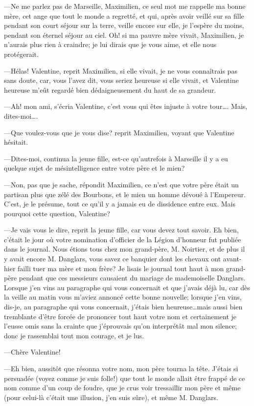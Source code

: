 —Ne me parlez pas de Marseille, Maximilien, ce seul mot me rappelle ma bonne mère, cet ange que tout le monde a regretté, et qui, après avoir veillé sur sa fille pendant son court séjour sur la terre, veille encore sur elle, je l'espère du moins, pendant son éternel séjour au ciel. Oh! si ma pauvre mère vivait, Maximilien, je n'aurais plus rien à craindre; je lui dirais que je vous aime, et elle nous protégerait. 

—Hélas! Valentine, reprit Maximilien, si elle vivait, je ne vous connaîtrais pas sans doute, car, vous l'avez dit, vous seriez heureuse si elle vivait, et Valentine heureuse m'eût regardé bien dédaigneusement du haut de sa grandeur. 

—Ah! mon ami, s'écria Valentine, c'est vous qui êtes injuste à votre tour\dots. Mais, dites-moi\dots. 

—Que voulez-vous que je vous dise? reprit Maximilien, voyant que Valentine hésitait. 

—Dites-moi, continua la jeune fille, est-ce qu'autrefois à Marseille il y a eu quelque sujet de mésintelligence entre votre père et le mien? 

—Non, pas que je sache, répondit Maximilien, ce n'est que votre père était un partisan plus que zélé des Bourbons, et le mien un homme dévoué à l'Empereur. C'est, je le présume, tout ce qu'il y a jamais eu de dissidence entre eux. Mais pourquoi cette question, Valentine? 

—Je vais vous le dire, reprit la jeune fille, car vous devez tout savoir. Eh bien, c'était le jour où votre nomination d'officier de la Légion d'honneur fut publiée dans le journal. Nous étions tous chez mon grand-père, M. Noirtier, et de plus il y avait encore M. Danglars, vous savez ce banquier dont les chevaux ont avant-hier failli tuer ma mère et mon frère? Je lisais le journal tout haut à mon grand-père pendant que ces messieurs causaient du mariage de mademoiselle Danglars. Lorsque j'en vins au paragraphe qui vous concernait et que j'avais déjà lu, car dès la veille au matin vous m'aviez annoncé cette bonne nouvelle; lorsque j'en vins, dis-je, au paragraphe qui vous concernait, j'étais bien heureuse\dots mais aussi bien tremblante d'être forcée de prononcer tout haut votre nom et certainement je l'eusse omis sans la crainte que j'éprouvais qu'on interprétât mal mon silence; donc je rassemblai tout mon courage, et je lus. 

—Chère Valentine!  

—Eh bien, aussitôt que résonna votre nom, mon père tourna la tête. J'étais si persuadée (voyez comme je suis folle!) que tout le monde allait être frappé de ce nom comme d'un coup de foudre, que je crus voir tressaillir mon père et même (pour celui-là c'était une illusion, j'en suis sûre), et même M. Danglars. 

